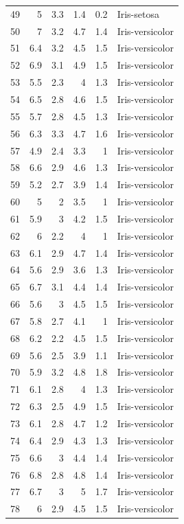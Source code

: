 \documentclass [oneside,10pt,a4paper,ngerman,BCOR10mm,headsepline,parindent,final]{scrartcl}
\begin{document}
\begin{longtable}[]{@{}rrrrrl@{}}
49 & 5 & 3.3 & 1.4 & 0.2 & Iris-setosa \\
50 & 7 & 3.2 & 4.7 & 1.4 & Iris-versicolor \\
51 & 6.4 & 3.2 & 4.5 & 1.5 & Iris-versicolor \\
52 & 6.9 & 3.1 & 4.9 & 1.5 & Iris-versicolor \\
53 & 5.5 & 2.3 & 4 & 1.3 & Iris-versicolor \\
54 & 6.5 & 2.8 & 4.6 & 1.5 & Iris-versicolor \\
55 & 5.7 & 2.8 & 4.5 & 1.3 & Iris-versicolor \\
56 & 6.3 & 3.3 & 4.7 & 1.6 & Iris-versicolor \\
57 & 4.9 & 2.4 & 3.3 & 1 & Iris-versicolor \\
58 & 6.6 & 2.9 & 4.6 & 1.3 & Iris-versicolor \\
59 & 5.2 & 2.7 & 3.9 & 1.4 & Iris-versicolor \\
60 & 5 & 2 & 3.5 & 1 & Iris-versicolor \\
61 & 5.9 & 3 & 4.2 & 1.5 & Iris-versicolor \\
62 & 6 & 2.2 & 4 & 1 & Iris-versicolor \\
63 & 6.1 & 2.9 & 4.7 & 1.4 & Iris-versicolor \\
64 & 5.6 & 2.9 & 3.6 & 1.3 & Iris-versicolor \\
65 & 6.7 & 3.1 & 4.4 & 1.4 & Iris-versicolor \\
66 & 5.6 & 3 & 4.5 & 1.5 & Iris-versicolor \\
67 & 5.8 & 2.7 & 4.1 & 1 & Iris-versicolor \\
68 & 6.2 & 2.2 & 4.5 & 1.5 & Iris-versicolor \\
69 & 5.6 & 2.5 & 3.9 & 1.1 & Iris-versicolor \\
70 & 5.9 & 3.2 & 4.8 & 1.8 & Iris-versicolor \\
71 & 6.1 & 2.8 & 4 & 1.3 & Iris-versicolor \\
72 & 6.3 & 2.5 & 4.9 & 1.5 & Iris-versicolor \\
73 & 6.1 & 2.8 & 4.7 & 1.2 & Iris-versicolor \\
74 & 6.4 & 2.9 & 4.3 & 1.3 & Iris-versicolor \\
75 & 6.6 & 3 & 4.4 & 1.4 & Iris-versicolor \\
76 & 6.8 & 2.8 & 4.8 & 1.4 & Iris-versicolor \\
77 & 6.7 & 3 & 5 & 1.7 & Iris-versicolor \\
78 & 6 & 2.9 & 4.5 & 1.5 & Iris-versicolor \\

\end{longtable}
\end{document}
